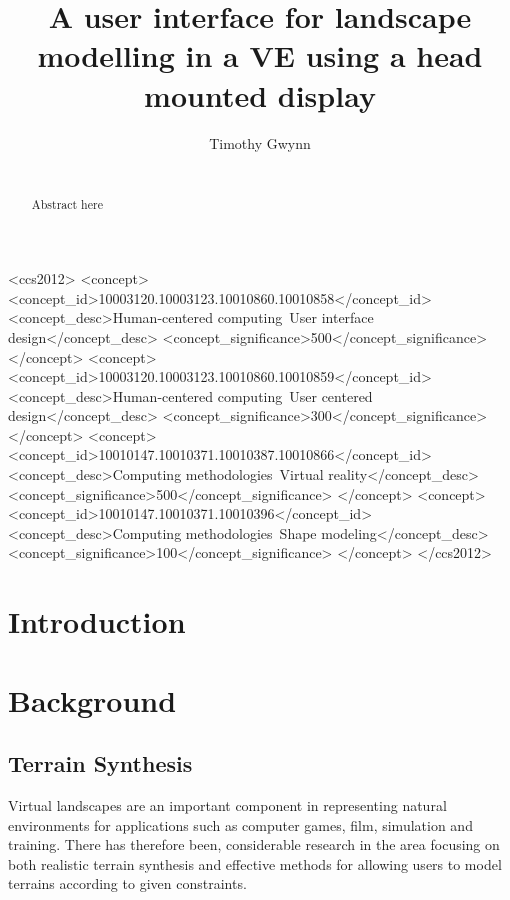 \documentclass{sig-alternate-05-2015}
\begin{document}
\title{A user interface for landscape modelling in a VE using a head mounted display}

\author{
\alignauthor
Timothy Gwynn\\
       \\
}
\maketitle
\begin{CCSXML}
 	<ccs2012>
 	<concept>
 	<concept_id>10003120.10003123.10010860.10010858</concept_id>
 	<concept_desc>Human-centered computing~User interface design</concept_desc>
 	<concept_significance>500</concept_significance>
 	</concept>
 	<concept>
 	<concept_id>10003120.10003123.10010860.10010859</concept_id>
 	<concept_desc>Human-centered computing~User centered design</concept_desc>
 	<concept_significance>300</concept_significance>
 	</concept>
 	<concept>
 	<concept_id>10010147.10010371.10010387.10010866</concept_id>
 	<concept_desc>Computing methodologies~Virtual reality</concept_desc>
 	<concept_significance>500</concept_significance>
 	</concept>
 	<concept>
 	<concept_id>10010147.10010371.10010396</concept_id>
 	<concept_desc>Computing methodologies~Shape modeling</concept_desc>
 	<concept_significance>100</concept_significance>
 	</concept>
 	</ccs2012>
\end{CCSXML}
 
 

\printccsdesc
{}
\begin{abstract}
	Abstract here
\end{abstract}
\section{Introduction}
\section{Background}
\subsection{Terrain Synthesis}
Virtual landscapes are an important component in representing natural environments for applications such as computer games, film, simulation and training\cite{Gain2015}. There has therefore been, considerable research in the area focusing on both realistic terrain synthesis and effective methods for allowing users to model terrains according to given constraints.
\end{document}
